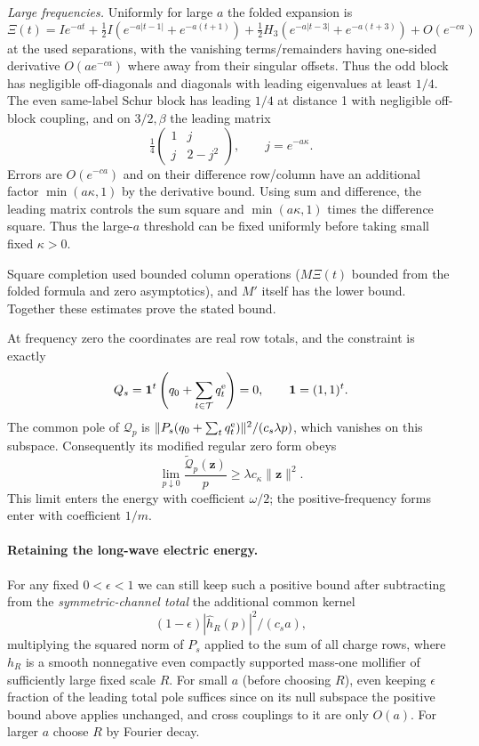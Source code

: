 \emph{Large frequencies.}
Uniformly for large \(a\) the folded expansion is
\[
 \Xi(t)=I e^{-at}+\tfrac12 I(e^{-a|t-1|}+e^{-a(t+1)})
 +\tfrac12 H_3(e^{-a|t-3|}+e^{-a(t+3)})+O(e^{-c a})
\]
at the used separations, with the vanishing terms/remainders having one-sided derivative \(O(a e^{-c a})\) where away from their singular offsets. Thus the odd block has negligible off-diagonals and diagonals with leading eigenvalues at least \(1/4\). The even same-label Schur block has leading \(1/4\) at distance 1 with negligible off-block coupling, and on \(3/2,\beta\) the leading matrix
\[
 \tfrac14\begin{pmatrix}1&j\\ j&2-j^2\end{pmatrix},\qquad j=e^{-a\kappa}.
\]
Errors are \(O(e^{-c a})\) and on their difference row/column have an additional factor \(\min(a\kappa,1)\) by the derivative bound. Using sum and difference, the leading matrix controls the sum square and \(\min(a\kappa,1)\) times the difference square. Thus the large-\(a\) threshold can be fixed uniformly before taking small fixed \(\kappa>0\). 

Square completion used bounded column operations (\(M\Xi(t)\) bounded from the folded formula and zero asymptotics), and \(M'\) itself has the lower bound. Together these estimates prove the stated bound. 

At frequency zero the
coordinates are real row totals, and the constraint is exactly
\[
 Q_s=\mathbf1^t\left(q_0+\sum_{t\in\mathcal T}q_t^{\rm e}\right)=0,
 \qquad \mathbf1=(1,1)^t.
\]
The common pole of \(\mathscr Q_p\) is
\(\|P_s(q_0+\sum_tq_t^{\rm e})\|^2/(c_s\lambda p)\), which vanishes
on this subspace. Consequently its modified regular zero form obeys
\[
 \lim_{p\downarrow0}\frac{\widetilde{\mathscr Q}_p(\mathbf z)}p
 \ge\lambda c_\kappa\|\mathbf z\|^2.
\]
This limit enters the energy with coefficient \(\omega/2\); the
positive-frequency forms enter with coefficient \(1/m\).

\paragraph{Retaining the long-wave electric energy.}
For any fixed \(0<\epsilon<1\) we can still keep such a positive bound after subtracting from the \emph{symmetric-channel total} the additional common kernel
\[
 (1-\epsilon)|\widehat h_R(p)|^2/(c_s a),
\]
multiplying the squared norm of \(P_s\) applied to the sum of all charge rows, where \(h_R\) is a smooth nonnegative even compactly supported mass-one mollifier of sufficiently large fixed scale \(R\). For small \(a\) (before choosing \(R\)), even keeping \(\epsilon\) fraction of the leading total pole suffices since on its null subspace the positive bound above applies unchanged, and cross couplings to it are only \(O(a)\). For larger \(a\) choose \(R\) by Fourier decay.

